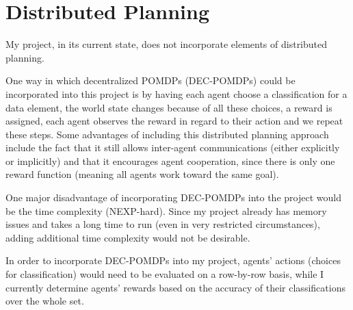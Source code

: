 \documentclass{article}
\begin{document}
\section{Distributed Planning}
\par
My project, in its current state, does not incorporate elements of distributed planning. 
\par
One way in which decentralized POMDPs (DEC-POMDPs) could be incorporated into this project is by having each agent choose a classification for a data element, the world state changes because of all these choices, a reward is assigned, each agent observes the reward in regard to their action and we repeat these steps. Some advantages of including this distributed planning approach include the fact that it still allows inter-agent communications (either explicitly or implicitly) and that it encourages agent cooperation, since there is only one reward function (meaning all agents work toward the same goal).
\par
One major disadvantage of incorporating DEC-POMDPs into the project would be the time complexity (NEXP-hard). Since my project already has memory issues and takes a long time to run (even in very restricted circumstances), adding additional time complexity would not be desirable.
\par
In order to incorporate DEC-POMDPs into my project, agents' actions (choices for classification) would need to be evaluated on a row-by-row basis, while I currently determine agents' rewards based on the accuracy of their classifications over the whole set.
\end{document}

